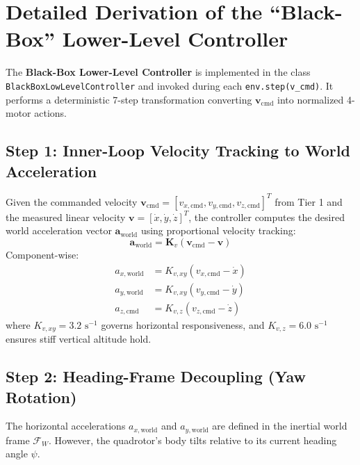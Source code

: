 \documentclass[11pt,a4paper]{article}
\begin{document}
\newpage

\section{Detailed Derivation of the ``Black-Box'' Lower-Level Controller}

The \textbf{Black-Box Lower-Level Controller} is implemented in the class \texttt{BlackBoxLowLevelController} and invoked during each \texttt{env.step(v\_cmd)}. It performs a deterministic 7-step transformation converting $\mathbf{v}_{\mathrm{cmd}}$ into normalized 4-motor actions.

\subsection{Step 1: Inner-Loop Velocity Tracking to World Acceleration}
Given the commanded velocity $\mathbf{v}_{\mathrm{cmd}} = [v_{x,\mathrm{cmd}}, v_{y,\mathrm{cmd}}, v_{z,\mathrm{cmd}}]^T$ from Tier 1 and the measured linear velocity $\mathbf{v} = [\dot{x}, \dot{y}, \dot{z}]^T$, the controller computes the desired world acceleration vector $\mathbf{a}_{\mathrm{world}}$ using proportional velocity tracking:
\begin{equation}
\mathbf{a}_{\mathrm{world}} = \mathbf{K}_v (\mathbf{v}_{\mathrm{cmd}} - \mathbf{v})
\end{equation}
Component-wise:
\begin{align}
a_{x,\mathrm{world}} &= K_{v,xy} (v_{x,\mathrm{cmd}} - \dot{x}) \label{eq:ax_world} \\
a_{y,\mathrm{world}} &= K_{v,xy} (v_{y,\mathrm{cmd}} - \dot{y}) \label{eq:ay_world} \\
a_{z,\mathrm{cmd}}   &= K_{v,z} (v_{z,\mathrm{cmd}} - \dot{z}) \label{eq:az_cmd}
\end{align}
where $K_{v,xy} = 3.2\text{ s}^{-1}$ governs horizontal responsiveness, and $K_{v,z} = 6.0\text{ s}^{-1}$ ensures stiff vertical altitude hold.

\subsection{Step 2: Heading-Frame Decoupling (Yaw Rotation)}
The horizontal accelerations $a_{x,\mathrm{world}}$ and $a_{y,\mathrm{world}}$ are defined in the inertial world frame $\mathcal{F}_W$. However, the quadrotor's body tilts relative to its current heading angle $\psi$. 
\end{document}

